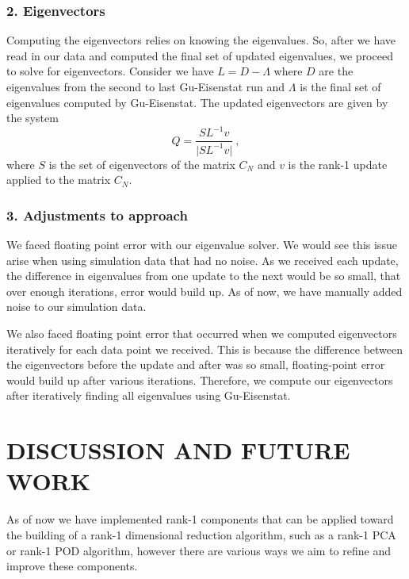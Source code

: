 \documentclass[onecolumn]{webofc}
\begin{document}
\subsubsection*{2. Eigenvectors}
Computing the eigenvectors relies on knowing the eigenvalues. So, after we have read in our data and computed the final set of updated eigenvalues, we proceed to solve for eigenvectors. Consider we have $L = D - \Lambda$ where $D$ are the eigenvalues from the second to last Gu-Eisenstat run and $\Lambda$ is the final set of eigenvalues computed by Gu-Eisenstat. %
 The updated eigenvectors are given by the system 
 \begin{equation}
 Q= \frac{S L^{-1} v}{\vert S L^{-1} v\vert} \ ,
 \end{equation}
where $S$ is the set of eigenvectors of the matrix $C_N$ and $v$ is the rank-1 update applied to the matrix $C_N$.
 
\subsubsection*{3. Adjustments to approach}
We faced floating point error with our eigenvalue solver. We would see this issue arise when using simulation data that had no noise.  As we received each update, the difference in eigenvalues from one update to the next would be so small, that over enough iterations, error would build up.  As of now, we have manually added noise to our simulation data.

	We also faced floating point error that occurred when we computed eigenvectors iteratively for each data point we received. This is because the difference between the eigenvectors before the update and after was so small, floating-point error would build up after various iterations. Therefore, we compute our eigenvectors after iteratively finding all eigenvalues using Gu-Eisenstat.


\section{DISCUSSION AND FUTURE WORK}
\label{disc}
As of now we have implemented rank-1 components that can be applied toward the building of a rank-1 dimensional reduction algorithm, such as a rank-1 PCA or rank-1 POD algorithm, however there are various ways we aim to refine and improve these components. 
\end{document}
